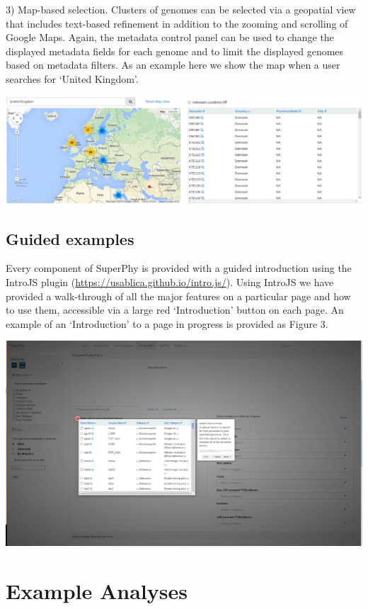 \documentclass[doublespacing, linenumbers]{bmcart}
\begin{document}
 3) Map-based selection. Clusters of genomes can be selected via a geopatial view that includes text-based refinement in addition to the zooming and scrolling of Google Maps. Again, the metadata control panel can be used to change the displayed metadata fields for each genome and to limit the displayed genomes based on metadata filters. As an example here we show the map when a user searches for `United Kingdom'.

 \includegraphics[width=\textwidth]{images/uk-map.png}

\subsection{Guided examples}
Every component of SuperPhy is provided with a guided introduction using the IntroJS plugin (\url{https://usablica.github.io/intro.js/}). Using IntroJS we have provided a walk-through of all the major features on a particular page and how to use them, accessible via a large red `Introduction' button on each page. An example of an `Introduction' to a page in progress is provided as Figure 3.

\includegraphics[width=\textwidth]{images/introjs_vfamr.png}

\section{Example Analyses}
\end{document}
